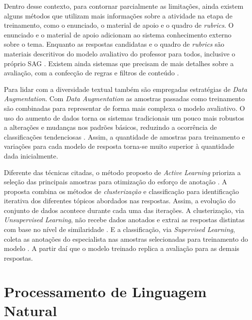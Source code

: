 Dentro desse contexto, para contornar parcialmente as limitações, ainda existem alguns métodos que utilizam mais informações sobre a atividade na etapa de treinamento, como o enunciado, o material de apoio e o quadro de \textit{rubrics}\cite{ramachandran2015b, wang2019}. O enunciado e o material de apoio adicionam ao sistema conhecimento externo sobre o tema. Enquanto as respostas candidatas e o quadro de \textit{rubrics} são materiais descritivos do modelo avaliativo do professor para todos, inclusive o próprio SAG \cite{mizumoto2019, marvaniya2018}. Existem ainda sistemas que precisam de mais detalhes sobre a avaliação, com a confecção de regras e filtros de conteúdo \cite{butcher2010, pribadi2017}.

Para lidar com a diversidade textual também são empregadas estratégias de \textit{Data Augmentation}. Com \textit{Data Augmentation} as amostras passadas como treinamento são combinadas para representar de forma mais complexa o modelo avaliativo. O uso do aumento de dados torna os sistemas tradicionais um pouco mais robustos a alterações e mudanças nos padrões básicos, reduzindo a ocorrência de classificações tendenciosas \cite{kumar2019, lun2020}. Assim, a quantidade de amostras para treinamento e variações para cada modelo de resposta torna-se muito superior à quantidade dada inicialmente.

Diferente das técnicas citadas, o método proposto de \textit{Active Learning} prioriza a seleção das principais amostras para otimização do esforço de anotação \cite{kumar2020}. A proposta combina os métodos de \textit{clusterização} \cite{spalenza2019} e classificação \cite{oliveira2014} para identificação iterativa dos diferentes tópicos abordados nas respostas. Assim, a evolução do conjunto de dados acontece durante cada uma das iterações. A clusterização, via \textit{Unsupervised Learning}, não recebe dados anotados e extrai as respostas distintas com base no nível de similaridade \cite{everitt2011}. E a classificação, via \textit{Supervised Learning}, coleta as anotações do especialista nas amostras selecionadas para treinamento do modelo \cite{bishop2006}. A partir daí que o modelo treinado replica a avaliação para as demais respostas.


\section{Processamento de Linguagem Natural}

